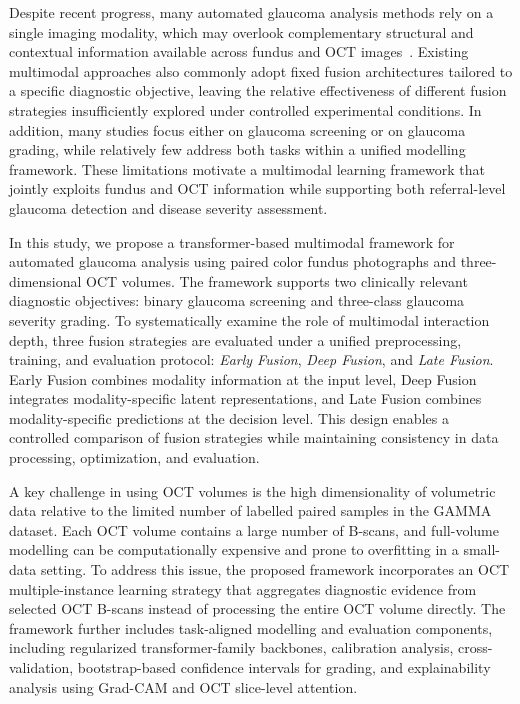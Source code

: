 \documentclass[preprint,12pt]{elsarticle}
\begin{document}
Despite recent progress, many automated glaucoma analysis methods rely on a single imaging modality, which may overlook complementary structural and contextual information available across fundus and OCT images~\cite{dai2021transmed,meedeniya2025glaucoma}. Existing multimodal approaches also commonly adopt fixed fusion architectures tailored to a specific diagnostic objective, leaving the relative effectiveness of different fusion strategies insufficiently explored under controlled experimental conditions. In addition, many studies focus either on glaucoma screening or on glaucoma grading, while relatively few address both tasks within a unified modelling framework. These limitations motivate a multimodal learning framework that jointly exploits fundus and OCT information while supporting both referral-level glaucoma detection and disease severity assessment.

In this study, we propose a transformer-based multimodal framework for automated glaucoma analysis using paired color fundus photographs and three-dimensional OCT volumes. The framework supports two clinically relevant diagnostic objectives: binary glaucoma screening and three-class glaucoma severity grading. To systematically examine the role of multimodal interaction depth, three fusion strategies are evaluated under a unified preprocessing, training, and evaluation protocol: \textit{Early Fusion}, \textit{Deep Fusion}, and \textit{Late Fusion}. Early Fusion combines modality information at the input level, Deep Fusion integrates modality-specific latent representations, and Late Fusion combines modality-specific predictions at the decision level. This design enables a controlled comparison of fusion strategies while maintaining consistency in data processing, optimization, and evaluation.

A key challenge in using OCT volumes is the high dimensionality of volumetric data relative to the limited number of labelled paired samples in the GAMMA dataset. Each OCT volume contains a large number of B-scans, and full-volume modelling can be computationally expensive and prone to overfitting in a small-data setting. To address this issue, the proposed framework incorporates an OCT multiple-instance learning strategy that aggregates diagnostic evidence from selected OCT B-scans instead of processing the entire OCT volume directly. The framework further includes task-aligned modelling and evaluation components, including regularized transformer-family backbones, calibration analysis, cross-validation, bootstrap-based confidence intervals for grading, and explainability analysis using Grad-CAM and OCT slice-level attention.
\end{document}
